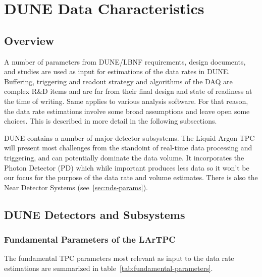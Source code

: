 \section{DUNE Data Characteristics}
\label{sec:data-characteristics}
\subsection{Overview}

A number of parameters from DUNE/LBNF requirements, design documents,  and studies are used  as input
for estimations of the data rates in DUNE.
Buffering, triggering and readout strategy and algorithms of the DAQ
are complex R\&D items and are far from their final design and state of
readiness at the time of writing. Same applies to various analysis software.
For that reason, the data rate estimations involve some broad assumptions
and leave open some choices. This is described in more detail in the following subsections.

DUNE contains a number of major detector subsystems. The Liquid Argon TPC will present most challenges from
the standoint of real-time data processing and triggering, and can potentially dominate the data volume.
It incorporates the Photon Detector (PD) which while important produces less data so it won't be our focus
for the purpose of the data rate and volume estimates. There is also the Near
Detector Systems (see~\ref{sec:nds-params}).

\subsection{DUNE Detectors and Subsystems}

\subsubsection{Fundamental Parameters of the LArTPC}
\label{sec:fundamental-parameters}

The fundamental TPC parameters most relevant as input to the data rate estimations are summarized in
table~\ref{tab:fundamental-parameters}.

